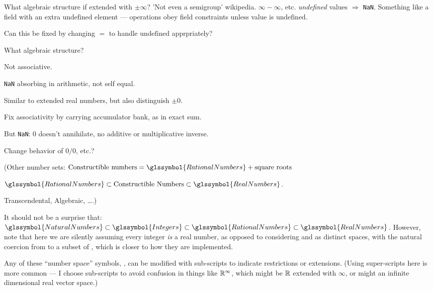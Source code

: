 What algebraic structure if extended with $\pm\infty$?
'Not even a semigroup' wikipedia.
$\infty - \infty$, etc. \textit{undefined} values $\Rightarrow$
\texttt{NaN}.
Something like a field with an extra $\text{undefined}$
element --- operations obey field constraints unless value is
$\text{undefined}$.

Can this be fixed by changing $=$ to handle $\text{undefined}$
apprpriately?


What algebraic structure?

Not associative.

\texttt{NaN} absorbing in arithmetic, not self equal.

Similar to extended real numbers, but also distinguish $\pm 0$.




Fix associativity by carrying accumulator bank,
as in exact sum.

But \texttt{NaN}: $0$ doesn't annihilate,
no additive or multiplicative inverse.

Change behavior of $0 / 0$, etc.?

(Other number sets:
$\text{Constructible numbers} = \glssymbol{RationalNumbers}
+ \text{square roots}$

$\glssymbol{RationalNumbers}
\subset 
\text{Constructible Numbers}
\subset 
\glssymbol{RealNumbers}$.

Transcendental, Algebraic, \ldots.)

It should not be a surprise that:
$\glssymbol{NaturalNumbers} 
\subset 
\glssymbol{Integers}
\subset 
\glssymbol{RationalNumbers}
\subset 
\glssymbol{RealNumbers}$.
However, note that here we are silently assuming every integer
\emph{is} a real number, as opposed to considering  and
 as distinct spaces, with the natural coercion
from  to a subset of ,
which is closer to how they are implemented.

Any of these ``number space'' symbols, ,
can be modified with sub-scripts to indicate restrictions or
extensions. 
(Using super-scripts here is more common --- I choose sub-scripts
to avoid confusion in things like $\mathbb{R}^{\infty}$,
which might be $\mathbb{R}$ extended with ${\infty}$, 
or might an infinite dimensional real vector space.)

